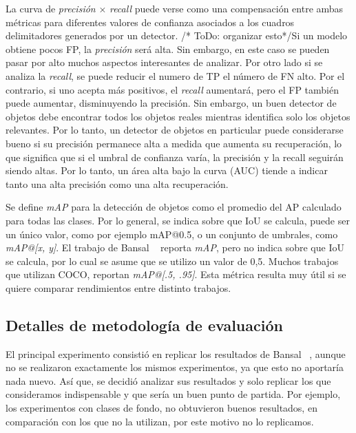 La curva de \textit{precisión} $\times$ \textit{recall} puede verse como una compensación entre ambas métricas para diferentes valores de confianza asociados a los cuadros delimitadores generados por un detector. /* ToDo: organizar esto*/Si un modelo obtiene pocos FP, la \textit{precisión} será alta. Sin embargo, en este caso se pueden pasar por alto muchos aspectos interesantes de analizar. Por otro lado si se analiza la \textit{recall}, se puede reducir el numero de TP el número de FN alto. Por el contrario, si uno acepta más positivos, el \textit{recall} aumentará, pero el FP también puede aumentar, disminuyendo la precisión. Sin embargo, un buen detector de objetos debe encontrar todos los objetos reales  mientras identifica solo los objetos relevantes. Por lo tanto, un detector de objetos en particular puede considerarse bueno si su precisión permanece alta a medida que aumenta su recuperación, lo que significa que si el umbral de confianza varía, la precisión y la recall seguirán siendo altas. Por lo tanto, un área alta bajo la curva (AUC) tiende a indicar tanto una alta precisión como una alta recuperación. 

Se define \textit{mAP} para la detección de objetos como el promedio del AP calculado para todas las clases. Por lo general, se indica sobre que IoU se calcula, puede ser un único valor, como por ejemplo mAP@0.5, o un conjunto de umbrales, como \textit{mAP@[x, y]}. El trabajo de Bansal \etal~\cite{bansal2018zero} reporta \textit{mAP}, pero no indica sobre que IoU se calcula, por lo cual se asume que se utilizo un valor de 0,5. Muchos trabajos que utilizan COCO, reportan \textit{mAP@[.5, .95]}. Esta métrica resulta muy útil si se quiere comparar rendimientos entre distinto trabajos.


\subsection{Detalles de metodología de evaluación} \label{ssec:detallesdemetodologiadeevaluacion}
El principal experimento consistió en replicar los resultados de Bansal \etal~\cite{bansal2018zero}, aunque no se realizaron exactamente los mismos experimentos, ya que esto no aportaría nada nuevo. Así que, se decidió analizar sus resultados y solo replicar los que consideramos indispensable y que sería un buen punto de partida. Por ejemplo, los experimentos con clases de fondo, no obtuvieron buenos resultados, en comparación con los que no la utilizan, por este motivo no lo replicamos.\\

